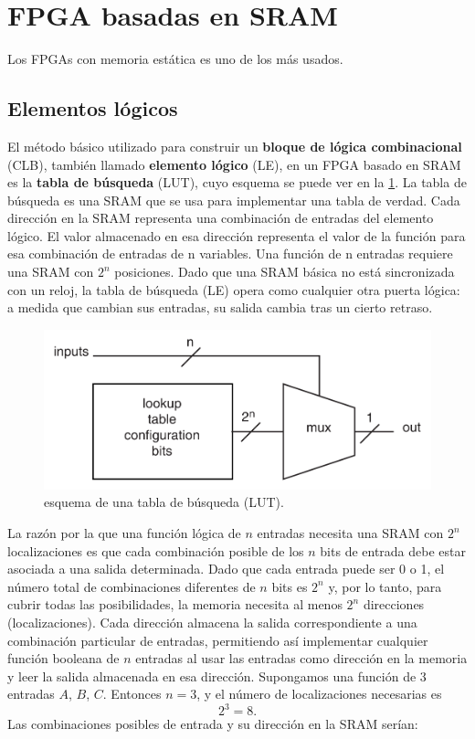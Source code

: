 \section{FPGA basadas en SRAM}

Los FPGAs con memoria estática es uno de los más usados. 


\subsection{Elementos lógicos}

El método básico utilizado para construir un \textbf{bloque de lógica combinacional} (CLB), también llamado \textbf{elemento lógico} (LE), en un FPGA basado en SRAM es la \textbf{tabla de búsqueda} (LUT), cuyo esquema se puede ver en la \cref{Fig:03-LUT}. La tabla de búsqueda es una SRAM que se usa para implementar una tabla de verdad. Cada dirección en la SRAM representa una combinación de entradas del elemento lógico. El valor almacenado en esa dirección representa el valor de la función para esa combinación de entradas de n variables. Una función de n entradas requiere una SRAM con $2^n$ posiciones. Dado que una SRAM básica no está sincronizada con un reloj, la tabla de búsqueda (LE) opera como cualquier otra puerta lógica: a medida que cambian sus entradas, su salida cambia tras un cierto retraso.

\begin{figure}[H] \centering
    \includegraphics[width=0.6\linewidth]{Imagenes/03/03-LUT.png}
    \caption{esquema de una tabla de búsqueda (LUT).}
    \label{Fig:03-LUT}
\end{figure}

La razón por la que una función lógica de $n$ entradas necesita una SRAM con $2^n$ localizaciones es que cada combinación posible de los $n$ bits de entrada debe estar asociada a una salida determinada. Dado que cada entrada puede ser 0 o 1, el número total de combinaciones diferentes de $n$ bits es $2^n$ y, por lo tanto, para cubrir todas las posibilidades, la memoria necesita al menos $2^n$ direcciones (localizaciones). Cada dirección almacena la salida correspondiente a una combinación particular de entradas, permitiendo así implementar cualquier función booleana de $n$ entradas al usar las entradas como dirección en la memoria y leer la salida almacenada en esa dirección. Supongamos una función de 3 entradas $A$, $B$, $C$. Entonces $n=3$, y el número de localizaciones necesarias es
$$
2^3=8.
$$
Las combinaciones posibles de entrada y su dirección en la SRAM serían:

